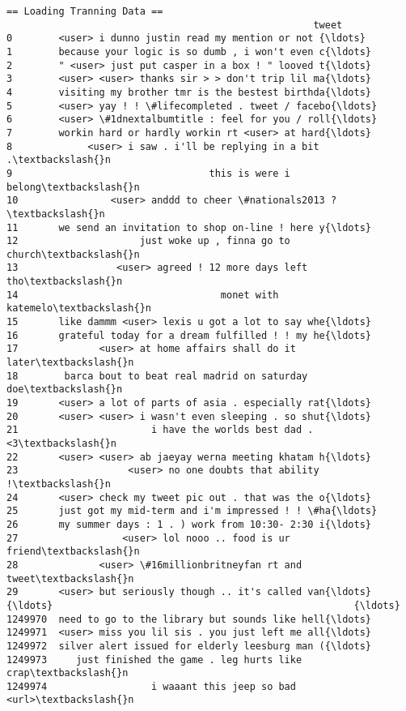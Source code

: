 \documentclass[11pt]{article}
\begin{document}
    \begin{Verbatim}[commandchars=\\\{\}]
 == Loading Tranning Data ==
                                                     tweet
0        <user> i dunno justin read my mention or not {\ldots}
1        because your logic is so dumb , i won't even c{\ldots}
2        " <user> just put casper in a box ! " looved t{\ldots}
3        <user> <user> thanks sir > > don't trip lil ma{\ldots}
4        visiting my brother tmr is the bestest birthda{\ldots}
5        <user> yay ! ! \#lifecompleted . tweet / facebo{\ldots}
6        <user> \#1dnextalbumtitle : feel for you / roll{\ldots}
7        workin hard or hardly workin rt <user> at hard{\ldots}
8             <user> i saw . i'll be replying in a bit .\textbackslash{}n
9                                  this is were i belong\textbackslash{}n
10                <user> anddd to cheer \#nationals2013 ?\textbackslash{}n
11       we send an invitation to shop on-line ! here y{\ldots}
12                     just woke up , finna go to church\textbackslash{}n
13                 <user> agreed ! 12 more days left tho\textbackslash{}n
14                                   monet with katemelo\textbackslash{}n
15       like dammm <user> lexis u got a lot to say whe{\ldots}
16       grateful today for a dream fulfilled ! ! my he{\ldots}
17              <user> at home affairs shall do it later\textbackslash{}n
18        barca bout to beat real madrid on saturday doe\textbackslash{}n
19       <user> a lot of parts of asia . especially rat{\ldots}
20       <user> <user> i wasn't even sleeping . so shut{\ldots}
21                       i have the worlds best dad . <3\textbackslash{}n
22       <user> <user> ab jaeyay werna meeting khatam h{\ldots}
23                   <user> no one doubts that ability !\textbackslash{}n
24       <user> check my tweet pic out . that was the o{\ldots}
25       just got my mid-term and i'm impressed ! ! \#ha{\ldots}
26       my summer days : 1 . ) work from 10:30- 2:30 i{\ldots}
27                  <user> lol nooo .. food is ur friend\textbackslash{}n
28              <user> \#16millionbritneyfan rt and tweet\textbackslash{}n
29       <user> but seriously though .. it's called van{\ldots}
{\ldots}                                                    {\ldots}
1249970  need to go to the library but sounds like hell{\ldots}
1249971  <user> miss you lil sis . you just left me all{\ldots}
1249972  silver alert issued for elderly leesburg man ({\ldots}
1249973     just finished the game . leg hurts like crap\textbackslash{}n
1249974                  i waaant this jeep so bad <url>\textbackslash{}n

\end{Verbatim}
\end{document}
